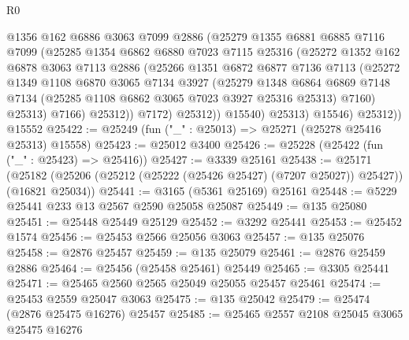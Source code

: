 \begin{lexlean}{R0}
\begin{coremodule}
                  @1356
                  @162
                  @6886
                  @3063
                  @7099
                  @2886
                  (@25279
                    @1355
                    @6881
                    @6885
                    @7116
                    @7099
                    (@25285
                      @1354
                      @6862
                      @6880
                      @7023
                      @7115
                      @25316
                      (@25272
                        @1352
                        @162
                        @6878
                        @3063
                        @7113
                        @2886
                        (@25266
                          @1351
                          @6872
                          @6877
                          @7136
                          @7113
                          (@25272
                            @1349
                            @1108
                            @6870
                            @3065
                            @7134
                            @3927
                            (@25279
                              @1348
                              @6864
                              @6869
                              @7148
                              @7134
                              (@25285 @1108 @6862 @3065 @7023 @3927 @25316 @25313)
                              @7160)
                            @25313)
                          @7166)
                        @25312))
                    @7172)
                  @25312))
              @15540)
            @25313)
          @15546)
        @25312))
    @15552
@25422 := @25249 (fun ("_" : @25013) => @25271 (@25278 @25416 @25313) @15558)
@25423 := @25012 @3400
@25426 := @25228 (@25422 (fun ("_" : @25423) => @25416))
@25427 := @3339 @25161
@25438 := @25171
    (@25182 (@25206 (@25212 (@25222 (@25426 @25427) (@7207 @25027)) @25427)) (@16821 @25034))
@25441 := @3165 (@5361 @25169) @25161
@25448 := @5229 @25441 @233 @13 @2567 @2590 @25058 @25087
@25449 := @135 @25080
@25451 := @25448 @25449 @25129
@25452 := @3292 @25441
@25453 := @25452 @1574
@25456 := @25453 @2566 @25056 @3063
@25457 := @135 @25076
@25458 := @2876 @25457
@25459 := @135 @25079
@25461 := @2876 @25459 @2886
@25464 := @25456 (@25458 @25461) @25449
@25465 := @3305 @25441
@25471 := @25465 @2560 @2565 @25049 @25055 @25457 @25461
@25474 := @25453 @2559 @25047 @3063
@25475 := @135 @25042
@25479 := @25474 (@2876 @25475 @16276) @25457
@25485 := @25465 @2557 @2108 @25045 @3065 @25475 @16276

\end{coremodule}
\end{lexlean}
